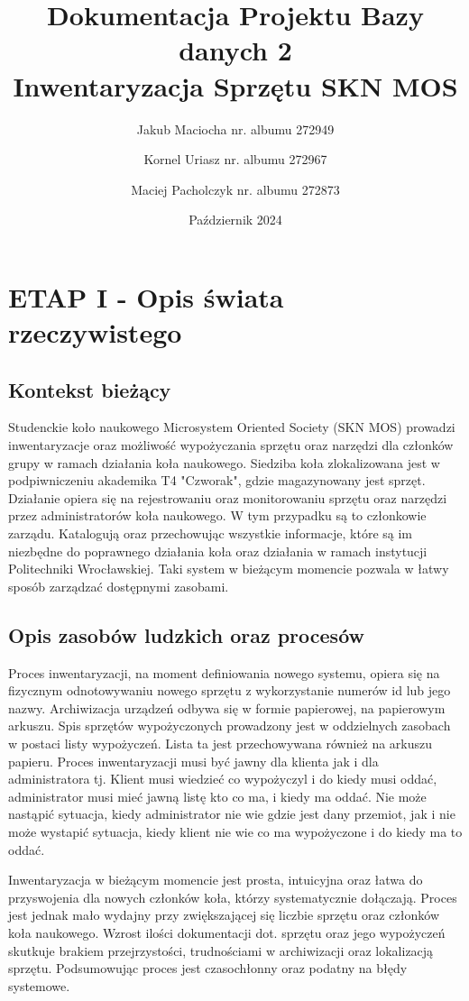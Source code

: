 \documentclass{article}
\title{Dokumentacja Projektu Bazy danych 2 \\ \large Inwentaryzacja Sprzętu SKN MOS }
\author{Jakub Maciocha nr. albumu 272949 \and Kornel Uriasz nr. albumu 272967 \and Maciej Pacholczyk nr. albumu 272873}
\date{Październik 2024}
\begin{document}
\maketitle

\newpage
\section{\textbf{ETAP I - Opis świata rzeczywistego}}
    \subsection{Kontekst bieżący}
    Studenckie koło naukowego Microsystem Oriented Society (SKN MOS) prowadzi inwentaryzacje oraz możliwość wypożyczania sprzętu oraz narzędzi dla członków grupy w ramach działania koła naukowego. Siedziba koła zlokalizowana jest w podpiwniczeniu akademika T4 "Czworak", gdzie magazynowany jest sprzęt. Działanie opiera się na rejestrowaniu oraz monitorowaniu sprzętu oraz narzędzi przez administratorów koła naukowego. W tym przypadku są to członkowie zarządu. Katalogują oraz przechowując wszystkie informacje, które są im niezbędne do poprawnego działania koła oraz działania w ramach instytucji Politechniki Wrocławskiej. Taki system w bieżącym momencie pozwala w łatwy sposób zarządzać dostępnymi zasobami.

    \subsection{Opis zasobów ludzkich oraz procesów}
    Proces inwentaryzacji, na moment definiowania nowego systemu, opiera się na fizycznym odnotowywaniu nowego sprzętu z wykorzystanie numerów id lub jego nazwy. Archiwizacja urządzeń odbywa się w formie papierowej, na papierowym arkuszu. Spis sprzętów wypożyczonych prowadzony jest w oddzielnych zasobach w postaci listy  wypożyczeń. Lista ta jest przechowywana również na arkuszu papieru. Proces inwentaryzacji musi być jawny dla klienta jak i dla administratora tj. Klient musi wiedzieć co wypożyczyl i do kiedy musi oddać, administrator musi mieć jawną listę kto co ma, i kiedy ma oddać. Nie może nastąpić sytuacja, kiedy administrator nie wie gdzie jest dany przemiot, jak i nie może wystapić sytuacja, kiedy klient nie wie co ma wypożyczone i do kiedy ma to oddać.
    
    Inwentaryzacja w bieżącym momencie jest prosta, intuicyjna oraz łatwa do przyswojenia dla nowych członków koła, którzy systematycznie dołączają. Proces jest jednak mało wydajny przy zwiększającej się liczbie sprzętu oraz członków koła naukowego. Wzrost ilości dokumentacji dot. sprzętu oraz jego wypożyczeń skutkuje brakiem przejrzystości, trudnościami w archiwizacji oraz lokalizacją sprzętu. Podsumowując proces jest czasochłonny oraz podatny na błędy systemowe.
\end{document}
